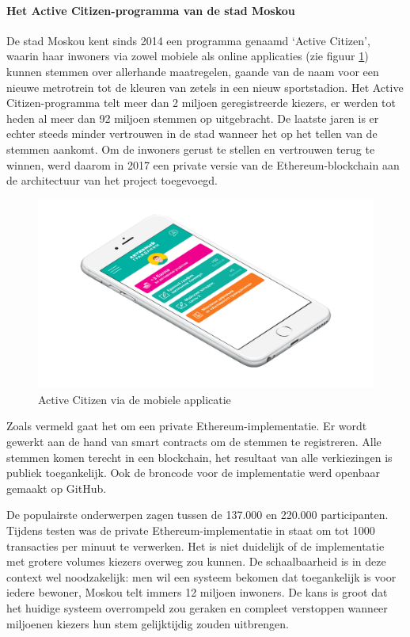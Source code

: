 				\paragraph{Het Active Citizen-programma van de stad Moskou}
				De stad Moskou kent sinds 2014 een programma genaamd `Active Citizen', waarin haar inwoners via zowel mobiele als online applicaties (zie figuur \ref{fig:active_citizen}) kunnen stemmen over allerhande maatregelen, gaande van de naam voor een nieuwe metrotrein tot de kleuren van zetels in een nieuw sportstadion. Het Active Citizen-programma telt meer dan 2 miljoen geregistreerde kiezers, er werden tot heden al meer dan 92 miljoen stemmen op uitgebracht. De laatste jaren is er echter steeds minder vertrouwen in de stad wanneer het op het tellen van de stemmen aankomt. Om de inwoners gerust te stellen en vertrouwen terug te winnen, werd daarom in 2017 een private versie van de Ethereum-blockchain aan de architectuur van het project toegevoegd. ~\autocite{Kshetri2018}
				
				\begin{figure}
					\includegraphics[width=\linewidth]{img/active_citizen.png}
					\caption{Active Citizen via de mobiele applicatie ~\autocite{Alexeev2016}}
					\label{fig:active_citizen}
				\end{figure}
				
				Zoals vermeld gaat het om een private Ethereum-implementatie. Er wordt gewerkt aan de hand van smart contracts om de stemmen te registreren. Alle stemmen komen terecht in een  blockchain, het resultaat van alle verkiezingen is publiek toegankelijk. Ook de broncode voor de implementatie werd openbaar gemaakt op GitHub.
				
				De populairste onderwerpen zagen tussen de 137.000 en 220.000 participanten. Tijdens testen was de private Ethereum-implementatie in staat om tot 1000 transacties per minuut te verwerken. Het is niet duidelijk of de implementatie met  grotere volumes kiezers overweg zou kunnen. De schaalbaarheid is in deze context wel noodzakelijk: men wil een systeem bekomen dat toegankelijk is voor iedere bewoner, Moskou telt immers 12 miljoen inwoners. De kans is groot dat het huidige systeem overrompeld zou geraken en compleet verstoppen wanneer miljoenen kiezers hun stem gelijktijdig zouden uitbrengen.
				
